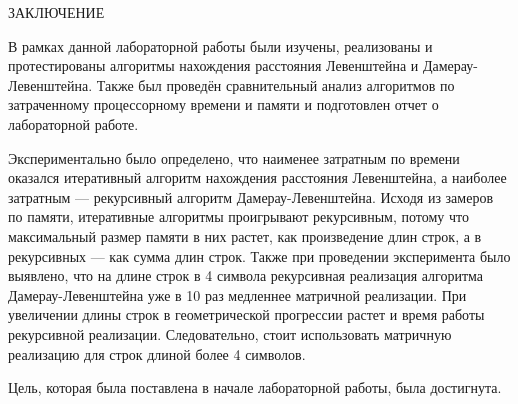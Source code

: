 \begin{center}
	ЗАКЛЮЧЕНИЕ
\end{center}

В рамках данной лабораторной работы были изучены, реализованы и протестированы алгоритмы нахождения расстояния Левенштейна и Дамерау-Левенштейна. Также был проведён сравнительный анализ алгоритмов по затраченному процессорному времени и памяти и подготовлен отчет о лабораторной работе.

Экспериментально было определено, что наименее затратным по времени оказался итеративный алгоритм нахождения расстояния Левенштейна, а наиболее затратным --- рекурсивный алгоритм Дамерау-Левенштейна. Исходя из замеров по памяти, итеративные алгоритмы проигрывают рекурсивным, потому что максимальный размер памяти в них растет, как произведение длин строк, а в рекурсивных --- как сумма длин строк.
Также при проведении эксперимента было выявлено, что на длине строк в 4 символа рекурсивная реализация алгоритма Дамерау-Левенштейна уже в 10 раз медленнее матричной реализации. При увеличении длины строк в геометрической прогрессии растет и время работы рекурсивной реализации. Следовательно, стоит использовать матричную реализацию для строк длиной более 4 символов.

Цель, которая была поставлена в начале лабораторной работы, была достигнута.